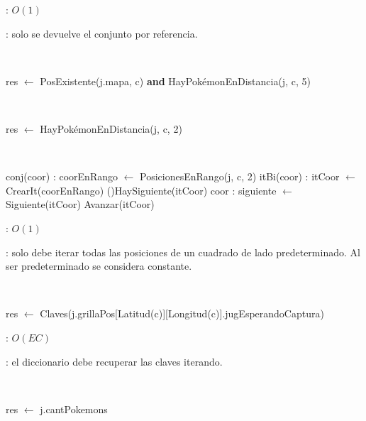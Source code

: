 \begin{Algoritmos}
	\complejidad: $O(1)$

	\justifcomp: solo se devuelve el conjunto por referencia.

	~

	\begin{algorithm}[H]
		\NoCaptionOfAlgo
		\caption{}
		res $\leftarrow$ PosExistente(j.mapa, c) \textbf{and} HayPokémonEnDistancia(j, c, 5)
	\end{algorithm}

	~

	\begin{algorithm}[H]
		\NoCaptionOfAlgo
		\caption{}
		res $\leftarrow$ HayPokémonEnDistancia(j, c, 2)
	\end{algorithm}

	~

	\begin{algorithm}[H]
		\NoCaptionOfAlgo
		\caption{}
		conj(coor) : coorEnRango $\leftarrow$ PosicionesEnRango(j, c, 2)
		itBi(coor) : itCoor $\leftarrow$ CrearIt(coorEnRango)
		\While(){HaySiguiente(itCoor)}{
			coor : siguiente $\leftarrow$ Siguiente(itCoor)
			Avanzar(itCoor)
		}
	\end{algorithm}

	\complejidad: $O(1)$

	\justifcomp: solo debe iterar todas las posiciones de un cuadrado de lado predeterminado. Al ser predeterminado se considera constante.

	~

	\begin{algorithm}[H]
		\NoCaptionOfAlgo
		\caption{}
		res $\leftarrow$ Claves(j.grillaPos[Latitud(c)][Longitud(c)].jugEsperandoCaptura)
	\end{algorithm}

	\complejidad: $O(EC)$

	\justifcomp: el diccionario debe recuperar las claves iterando.

	~

	\begin{algorithm}[H]
		\NoCaptionOfAlgo
		\caption{}
		res $\leftarrow$ j.cantPokemons
	\end{algorithm}


\end{Algoritmos}
